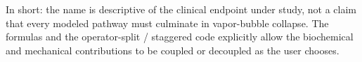 In short: the name is descriptive of the clinical endpoint under study, not a claim that every modeled pathway must culminate in vapor-bubble collapse. The formulas and the operator-split / staggered code explicitly allow the biochemical and mechanical contributions to be coupled or decoupled as the user chooses.
